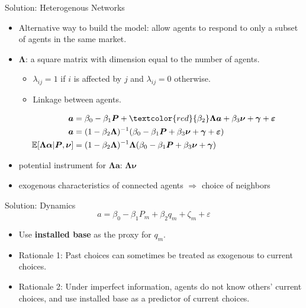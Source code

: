 \documentclass[aspectratio=169]{beamer}  %
\begin{document}
\begin{frame}{Solution: Heterogenous Networks}
    \vspace{-0.1cm}
    \begin{itemize}
        \item Alternative way to build the model: allow agents to respond to only a subset of agents in the same market.
        \item $\bm{\Lambda}$: a square matrix with dimension equal to
        the number of agents.
        \begin{itemize}
            \item $\lambda_{ij}= 1$ if $i$ is affected by $j$ and $\lambda_{ij}= 0$ otherwise.
            \item Linkage between agents.
        \end{itemize}
    \end{itemize}
    \vspace{-0.2cm}
    \begin{align*}
        \bm{a} &= \beta_0 - \beta_1 \bm{P} + \textcolor{red}{\beta_2} \bm{\Lambda} \bm{a} + \beta_3 \bm{\nu} + \bm{\gamma} + \bm{\varepsilon} \\
        \bm{a} &= (1 - \beta_2 \bm{\Lambda})^{-1} (\beta_0 - \beta_1 \bm{P} + \beta_3 \bm{\nu} + \bm{\gamma} + \bm{\varepsilon}) \\
        \mathbb{E}[\bm{\Lambda} \bm{\alpha} | \bm{P}, \bm{\nu}] &= (1 - \beta_2 \bm{\Lambda})^{-1} \bm{\Lambda} (\beta_0 - \beta_1 \bm{P} + \beta_3 \bm{\nu} + \bm{\gamma})
    \end{align*}
    \vspace{-0.3cm}
    \begin{itemize}
        \item potential instrument for $\bm{\Lambda}\bm{a}$: $\bm{\Lambda}\bm{\nu}$
        \item exogenous characteristics of connected agents $\Rightarrow$ choice of neighbors
    \end{itemize}
\end{frame}
\begin{frame}{Solution: Dynamics}
    $$ a = \beta_0 - \beta_1P_m + \beta_2q_m + \zeta_m + \varepsilon $$
    \begin{itemize}
        \item Use \textbf{installed base} as the proxy for $q_m$.
        \item Rationale 1: Past choices can sometimes be treated as exogenous to current choices.
        \item Rationale 2: Under imperfect information, agents do not know others' current choices, and use installed base as a predictor of current choices.
    \end{itemize}
\end{frame}
\end{document}
